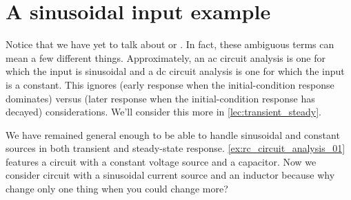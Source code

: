 \documentclass[electronics.tex]{subfiles}
\begin{document}
\section{A sinusoidal input example}
\tags{}

Notice that we have yet to talk about  or .
In fact, these ambiguous terms can mean a few different things.
Approximately, an ac circuit analysis is one for which the input is sinusoidal and a dc circuit analysis is one for which the input is a constant.
This ignores  (early response when the initial-condition response dominates) versus  (later response when the initial-condition response has decayed) considerations.
We'll consider this more in \autoref{lec:transient_steady}.
\tags{}

We have remained general enough to be able to handle sinusoidal and constant sources in both transient and steady-state response.
\autoref{ex:rc_circuit_analysis_01} features a circuit with a constant voltage source and a capacitor.
Now we consider circuit with a sinusoidal current source and an inductor because why change only one thing when you could change more?
\end{document}
